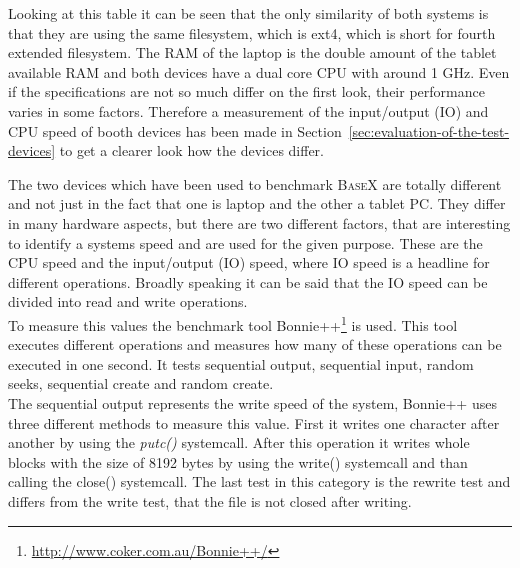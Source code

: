 Looking at this table it can be seen that the only similarity of both systems is that they are using the same filesystem, which is ext4, which is short for fourth extended filesystem.
The RAM of the laptop is the double amount of the tablet available RAM and both devices have a dual core CPU with around 1 GHz.
Even if the specifications are not so much differ on the first look, their performance varies in some factors.
Therefore a measurement of the input/output (IO) and CPU speed of booth devices has been made in Section~\ref{sec:evaluation-of-the-test-devices} to get a clearer look how the devices differ.


The two devices which have been used to benchmark \textsc{BaseX} are totally different and not just in the fact that one is laptop and the other a tablet PC.
They differ in many hardware aspects, but there are two different factors, that are interesting to identify a systems speed and are used for the given purpose.
These are the CPU speed and the input/output (IO) speed, where IO speed is a headline for different operations.
Broadly speaking it can be said that the IO speed can be divided into read and write operations.\\
To measure this values the benchmark tool Bonnie++\footnote{\url{http://www.coker.com.au/Bonnie++/}} is used.
This tool executes different operations and measures how many of these operations can be executed in one second.
It tests sequential output, sequential input, random seeks, sequential create and random create.\\
The sequential output represents the write speed of the system, Bonnie++ uses three different methods to measure this value.
First it writes one character after another by using the \textit{putc()} systemcall. 
After this operation it writes whole blocks with the size of 8192 bytes by using the write() systemcall and than calling the close() systemcall.
The last test in this category is the rewrite test and differs from the write test, that the file is not closed after writing.
